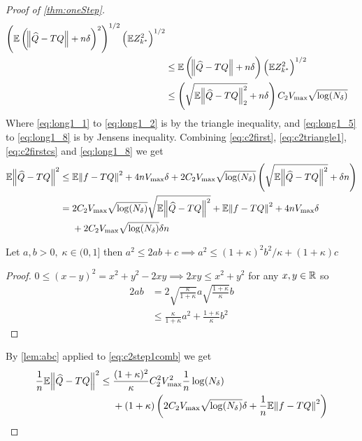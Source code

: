 \begin{proof}[Proof of \cref{thm:oneStep}]
\begin{align}
    \left( \mathbb{E} \left(\norm{\widehat{Q} - TQ} + n \delta \right)^2 \right)^{1/2}
    \left( \mathbb{E} Z_{k^*}^2 \right)^{1/2} 
    \label{eq:long1_4}
    \\ &\leq 
    \mathbb{E} \left(\norm{\widehat{Q} - TQ} + n \delta \right) 
    \left( \mathbb{E} Z_{k^*}^2 \right)^{1/2} 
    \label{eq:long1_5}
    \\ &\leq \left(\sqrt{\mathbb{E} \norm{\widehat{Q} -TQ}_2^2} + n \delta \right)
    C_2 V_{\max} \sqrt{\log(N_\delta)}
    \label{eq:long1_8}
  \end{align}
  Where \cref{eq:long1_1} to \cref{eq:long1_2} is by the triangle inequality,
  and \cref{eq:long1_5} to \cref{eq:long1_8} is by Jensens inequality.
  Combining \cref{eq:c2first}, \cref{eq:c2triangle1},
  \cref{eq:c2firstcs} and \cref{eq:long1_8} we get
  \begin{align}
    \mathbb{E} \norm{\widehat{Q} - TQ}^2
    \leq&\; \mathbb{E} \norm{f - TQ}^2 + 4 n V_{\max} \delta
    + 2 C_2 V_{\max} \sqrt{\log(N_\delta)}
    \left( \sqrt{\mathbb{E} \norm{\widehat{Q} - T Q}^2} + \delta n \right)
    \\ =&\;
    2 C_2 V_{\max} \sqrt{\log(N_\delta)} \sqrt{\mathbb{E} \norm{\widehat{Q} - T Q}^2}
    + \mathbb{E} \norm{f - TQ}^2 + 4 n V_{\max} \delta
    \notag
    \\ &\; + 2 C_2 V_{\max} \sqrt{\log(N_\delta)} \delta n
    \label{eq:c2step1comb}
  \end{align}
  \begin{lem} Let $a,b>0,\; \kappa \in (0,1]$ then
    $ a^2 \leq 2ab + c \implies a^2 \leq (1 + \kappa)^2 b^2 / \kappa
    + (1 + \kappa) c $
    \label{lem:abc}
  \end{lem}
  \begin{proof} $0 \leq (x - y)^2 = x^2 + y^2 - 2xy \implies 2xy \leq x^2 + y^2$
    for any $x, y \in \mathbb{R}$ so
    \begin{align*}
      2ab & = 2 \sqrt{\frac{\kappa}{1+\kappa}} a \sqrt{\frac{1+\kappa}{\kappa}} b
      \\ & \leq \frac{\kappa}{1+\kappa} a^2 + \frac{1 + \kappa}{\kappa} b^2
    \end{align*}
  \end{proof}
  By \cref{lem:abc} applied to \cref{eq:c2step1comb} we get
  \begin{align}
    \frac{1}{n} \mathbb{E} \norm{\widehat{Q} - TQ}^2
    \leq & \;
    \frac{(1+\kappa)^2}{\kappa} C_2^2 V_{\max}^2 \frac{1}{n} \log(N_\delta) 
    \notag
    \\ & \; + (1 + \kappa) \left( 2 C_2 V_{\max} \sqrt{\log(N_\delta)} \delta
    + \frac{1}{n} \mathbb{E} \norm{f - TQ}^2 \right)
    \label{eq:c2step1final0}
  \end{align}


\end{proof}
